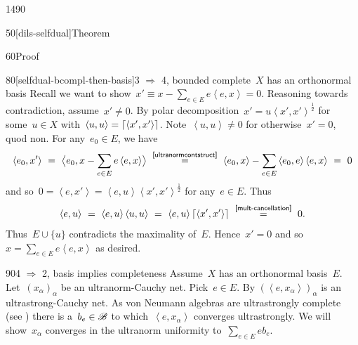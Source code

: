 \begin{parsec}{1490}
\begin{point}{50}[dils-selfdual]{Theorem}
\begin{point}{60}{Proof}
\begin{point}{80}[selfdual-bcompl-then-basis]{3
    $\Rightarrow$ 4, bounded complete~$X$ has an orthonormal basis}
Recall we want to
show~$x' \equiv x - \sum_{e \in E} e\left<e,x\right>= 0$.
Reasoning towards contradiction, assume~$x' \neq 0$.
By polar decomposition~$x' = u\left<x',x'\right>^{\frac{1}{2}}$
for some~$u \in X$ with~$\left<u,u\right> = \left\lceil\left<x',x'\right>\right\rceil$.
Note~$\left<u,u\right> \neq 0$
    for otherwise~$x' = 0$, quod non.
For any~$e_0 \in E$, we have
\begin{equation*}
   \left<e_0, x'\right> \ =\ 
   \bigl<e_0, x-\sum_{e\in E} e\left<e,x\right>\bigr> 
   \ \overset{\sref{ultranormcontstruct}}{=} \ 
   \left<e_0, x\right> - \sum_{e \in E}\left<e_0, e\right>\left<e,x\right> \ =\  0
\end{equation*}
and so~$0 = \left<e,x'\right> = \left<e, u\right>\left<x',x'\right>^{\frac{1}{2}}$ for any~$e \in E$.
Thus
\begin{equation*}
        \left<e, u\right> \ =\ 
        \left<e, u\right> \left<u,u\right> \ = \ 
        \left<e, u\right> \ceil{\left<x',x'\right>}
        \ \overset{\sref{mult-cancellation}}{=}\  0.
\end{equation*}
Thus~$E \cup \{ u \}$ contradicts the maximality of~$E$.
Hence~$x'=0$ and so~$x = \sum_{e \in E} e\left<e,x\right>$ as desired.
\end{point}
\begin{point}{90}{4 $\Rightarrow$ 2, basis implies completeness}%
    Assume~$X$ has an orthonormal basis~$E$.
    Let~$(x_\alpha)_\alpha$ be an ultranorm-Cauchy net.
    Pick~$e \in E$.
    By \sref{ultranormcontstruct}
    $(\left<e, x_\alpha\right>)_\alpha$ is an ultrastrong-Cauchy net.
    As von Neumann algebras are ultrastrongly complete
    (see )
        there is a~$b_e \in \mathscr{B}$
            to which~$\left<e,x_\alpha\right>$ converges ultrastrongly.
    We will show~$x_\alpha$ converges in the ultranorm uniformity
        to~$\sum_{e \in E} e b_e$.


\end{point}
\end{point}
\end{point}
\end{parsec}

